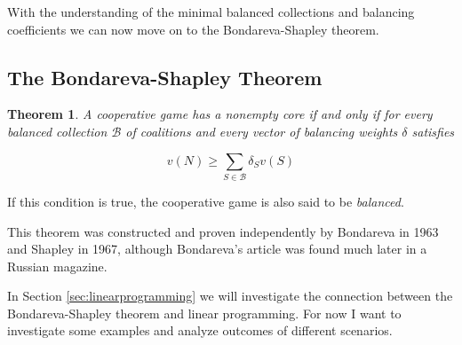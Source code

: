 \documentclass[10pt,a4paper,titlepage]{article}
\theoremstyle{plain}
\newtheorem{thm}{Theorem}[section] %
\theoremstyle{definition}
\begin{document}
With the understanding of the minimal balanced collections and balancing coefficients we can now move on to the Bondareva-Shapley theorem.


\subsection{The Bondareva-Shapley Theorem}\label{sec:bondareva}

\begin{thm}\label{thm:bondareva}
    A cooperative game has a nonempty core if and only if for every balanced collection $\mathcal{B}$ of coalitions and every vector of balancing weights $\delta$ satisfies

    \begin{equation}
        v(N) \geq \sum_{S \in \mathcal{B}} \delta_S v(S)
    \end{equation}
\end{thm}

If this condition is true, the cooperative game is also said to be \textit{balanced}.

This theorem was constructed and proven independently by Bondareva\cite{bondareva} in 1963 and Shapley\cite{shapley} in 1967, although Bondareva's article was found much later in a Russian magazine.

In Section \ref{sec:linearprogramming} we will investigate the connection between the Bondareva-Shapley theorem and linear programming. For now I want to investigate some examples and analyze outcomes of different scenarios.
\end{document}
